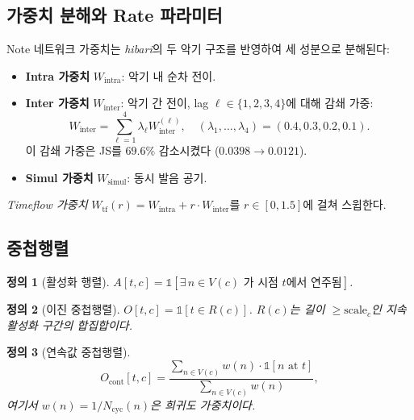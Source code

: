 \documentclass[conference,10pt,a4paper]{IEEEtran}
\newtheorem{definition}{정의}
\begin{document}
\subsection{가중치 분해와 Rate 파라미터}
\label{subsec:weights}

Note 네트워크 가중치는 \emph{hibari}의 두 악기 구조를 반영하여
세 성분으로 분해된다:

\begin{itemize}[nosep]
\item \textbf{Intra 가중치} $W_{\mathrm{intra}}$: 악기 내 순차 전이.
\item \textbf{Inter 가중치} $W_{\mathrm{inter}}$: 악기 간 전이,
      lag $\ell \in \{1,2,3,4\}$에 대해 감쇄 가중:
\begin{equation}
W_{\mathrm{inter}} = \sum_{\ell=1}^{4} \lambda_\ell W_{\mathrm{inter}}^{(\ell)},
\quad (\lambda_1,\ldots,\lambda_4) = (0.4, 0.3, 0.2, 0.1).
\end{equation}
      이 감쇄 가중은 JS를 $69.6\%$ 감소시켰다 ($0.0398 \to 0.0121$).
\item \textbf{Simul 가중치} $W_{\mathrm{simul}}$: 동시 발음 공기.
\end{itemize}

\emph{Timeflow 가중치} $W_{\mathrm{tf}}(r) = W_{\mathrm{intra}} + r \cdot W_{\mathrm{inter}}$를
$r \in [0, 1.5]$에 걸쳐 스윕한다.

\subsection{중첩행렬}
\label{subsec:overlap}

\begin{definition}[활성화 행렬]
$A[t,c] = \mathbb{1}[\exists\, n \in V(c) \text{ 가 시점 } t \text{에서 연주됨}]$.
\end{definition}

\begin{definition}[이진 중첩행렬]
$O[t,c] = \mathbb{1}[t \in R(c)]$. $R(c)$는 길이 $\ge \mathrm{scale}_c$인
지속 활성화 구간의 합집합이다.
\end{definition}

\begin{definition}[연속값 중첩행렬]
\begin{equation}
O_{\mathrm{cont}}[t,c] = \frac{\sum_{n \in V(c)} w(n) \cdot \mathbb{1}[n \text{ at } t]}
                               {\sum_{n \in V(c)} w(n)},
\end{equation}
여기서 $w(n) = 1/N_{\mathrm{cyc}}(n)$은 희귀도 가중치이다.
\end{definition}
\end{document}
